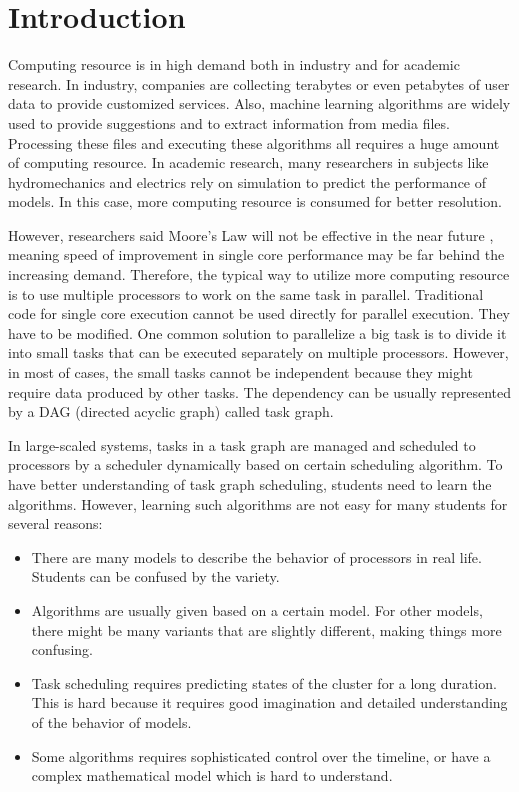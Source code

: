 \documentclass[msc,deptreport, cs]{infthesis}
\begin{document}
{\let\clearpage\relax \chapter{Introduction}}

Computing resource is in high demand both in industry and for academic research. In industry, companies are collecting terabytes or even petabytes of user data to provide customized services. Also, machine learning algorithms are widely used to provide suggestions and to extract information from media files. Processing these files and executing these algorithms all requires a huge amount of computing resource. In academic research, many researchers in subjects like hydromechanics and electrics rely on simulation to predict the performance of models. In this case, more computing resource is consumed for better resolution.

However, researchers said Moore's Law will not be effective in the near future \cite{Waldrop2016}, meaning speed of improvement in single core performance may be far behind the increasing demand. Therefore, the typical way to utilize more computing resource is to use multiple processors to work on the same task in parallel. Traditional code for single core execution cannot be used directly for parallel execution. They have to be modified. One common solution to parallelize a big task is to divide it into small tasks that can be executed separately on multiple processors. However, in most of cases, the small tasks cannot be independent because they might require data produced by other tasks. The dependency can be usually represented by a DAG (directed acyclic graph) called task graph.

In large-scaled systems, tasks in a task graph are managed and scheduled to processors by a scheduler dynamically based on certain scheduling algorithm. To have better understanding of task graph scheduling, students need to learn the algorithms. However, learning such algorithms are not easy for many students for several reasons:

\begin{itemize}
  \item There are many models to describe the behavior of processors in real life. Students can be confused by the variety.
  \item Algorithms are usually given based on a certain model. For other models, there might be many variants that are slightly different, making things more confusing.
  \item Task scheduling requires predicting states of the cluster for a long duration. This is hard because it requires good imagination and detailed understanding of the behavior of models.
  \item Some algorithms requires sophisticated control over the timeline, or have a complex mathematical model which is hard to understand.
\end{itemize}
\end{document}
